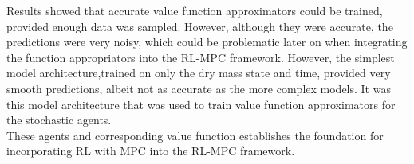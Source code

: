Results showed that accurate value function approximators could be trained, provided enough data was sampled. However, although they were accurate, the predictions were very noisy, which could be problematic later on when integrating the function appropriators into the RL-MPC framework. However, the simplest model architecture,trained on only the dry mass state and time, provided very smooth predictions, albeit not as accurate as the more complex models. It was this model architecture that was used to train value function approximators for the stochastic agents.\\
These agents and corresponding value function establishes the foundation for incorporating RL with MPC into the RL-MPC framework.
